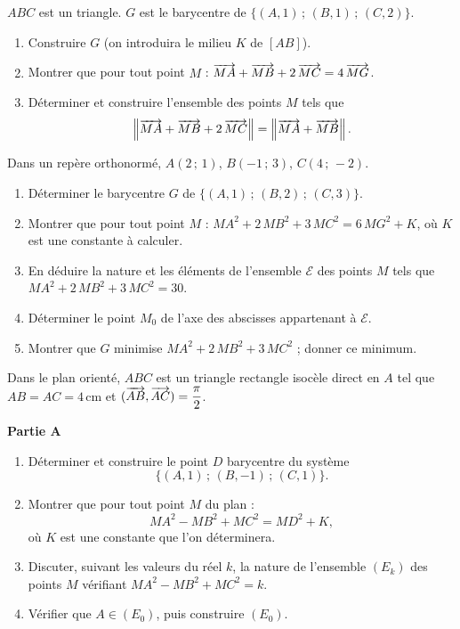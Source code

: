 $ABC$ est un triangle. $G$ est le barycentre de $\{(A,1)\,;\,(B,1)\,;\,(C,2)\}$.
\begin{enumerate}
	\item Construire $G$ (on introduira le milieu $K$ de $[AB]$).
	\item Montrer que pour tout point $M$ :
	$\overrightarrow{MA} + \overrightarrow{MB} + 2\,\overrightarrow{MC} = 4\,\overrightarrow{MG}$.
	\item Déterminer et construire l'ensemble des points $M$ tels que
	$$
	\left\| \overrightarrow{MA} + \overrightarrow{MB} + 2\,\overrightarrow{MC} \right\| = \left\| \overrightarrow{MA} + \overrightarrow{MB} \right\|.
	$$
\end{enumerate}

Dans un repère orthonormé, $A(2\,;\,1)$, $B(-1\,;\,3)$, $C(4\,;\,-2)$.
\begin{enumerate}
	\item Déterminer le barycentre $G$ de $\{(A,1)\,;\,(B,2)\,;\,(C,3)\}$.
	\item Montrer que pour tout point $M$ :
	$MA^2 + 2\,MB^2 + 3\,MC^2 = 6\,MG^2 + K$, où $K$ est une constante à calculer.
	\item En déduire la nature et les éléments de l'ensemble $\mathscr{E}$ des
	points $M$ tels que $MA^2 + 2\,MB^2 + 3\,MC^2 = 30$.
	\item Déterminer le point $M_0$ de l'axe des abscisses appartenant à $\mathscr{E}$.
	\item Montrer que $G$ minimise $MA^2 + 2\,MB^2 + 3\,MC^2$ ; donner ce minimum.
\end{enumerate}

Dans le plan orienté, $ABC$ est un triangle rectangle isocèle direct en $A$ tel
que $AB = AC = 4\,$cm et $(\overrightarrow{AB},\overrightarrow{AC}) = \dfrac{\pi}{2}$.

\textbf{Partie A}
\begin{enumerate}
	\item Déterminer et construire le point $D$ barycentre du système
	$$\{(A,1)\,;\,(B,-1)\,;\,(C,1)\}.$$
	\item Montrer que pour tout point $M$ du plan :
	$$
	MA^2 - MB^2 + MC^2 = MD^2 + K,
	$$
	où $K$ est une constante que l'on déterminera.
	\item Discuter, suivant les valeurs du réel $k$, la nature de l'ensemble
	$(E_k)$ des points $M$ vérifiant $MA^2 - MB^2 + MC^2 = k$.
	\item Vérifier que $A \in (E_0)$, puis construire $(E_0)$.
\end{enumerate}

